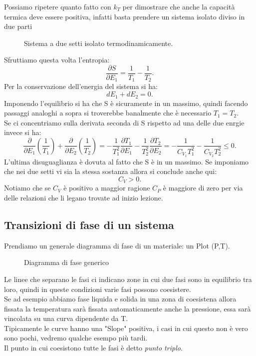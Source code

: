 \noindent 
Possiamo ripetere quanto fatto con $k_{T}$ per dimostrare che anche la capacità termica deve essere positiva, infatti basta prendere un sistema isolato diviso in due parti
\begin{figure}[H]
    \centering
    \caption{Sistema a due setti isolato termodinamicamente.}
    \label{fig:sistema-isolato}
\end{figure}
\noindent
Sfruttiamo questa volta l'entropia:
\[
	\frac{\partial S}{\partial E_1} = \frac{1}{T_1}- \frac{1}{T_2}
.\] 
Per la conservazione dell'energia del sistema si ha:
\[
	dE_1 + dE_2=0
.\] 
Imponendo l'equilibrio si ha che S è sicuramente in un massimo, quindi facendo passaggi analoghi a sopra si troverebbe banalmente che è necessario $T_1 = T_2$.\\
Se ci concentriamo sulla derivata seconda di S rispetto ad una delle due enrgie invece si ha:
\[
	\frac{\partial }{\partial E_1} \left( \frac{1}{T_1} \right) + \frac{\partial }{\partial E_2} \left( \frac{1}{T_2} \right) =
	-\frac{1}{T_1^2}\frac{\partial T_1}{\partial E_1} -\frac{1}{T_2^2}\frac{\partial T_2}{\partial E_2} = 
	-\frac{1}{C_{V_1}T_1^2}-\frac{1}{C_{V_2}T_2^2} \le 0
.\] 
L'ultima disuguaglianza è dovuta al fatto che S è in un massimo. Se imponiamo che nei due setti vi sia la stessa sostanza allora si conclude anche qui:
\[
	C_{V}>0
.\] 
Notiamo che se $C_{V}$ è positivo a maggior ragione $C_{P}$ è maggiore di zero per via delle relazioni che li legano trovate ad inizio lezione.

\subsection{Transizioni di fase di un sistema}%
\label{sec:transizioni-di-fase}
Prendiamo un generale diagramma di fase di un materiale: un Plot (P,T).
\begin{figure}[H]
    \centering
    \caption{Diagramma di fase generico}
    \label{fig:diagramma-di-fase-generico}
\end{figure}
\noindent
Le linee che separano le fasi ci indicano zone in cui due fasi sono in equilibrio tra loro, quindi in queste condizioni varie fasi possono coesistere. \\
Se ad esempio abbiamo fase liquida e solida in una zona di coesistena allora fissata la temperatura sarà fissata automaticamente anche la pressione, essa sarà vincolata su una curva dipendente da T.\\
Tipicamente le curve hanno una "Slope" positiva, i casi in cui questo non è vero sono pochi, vedremo qualche esempo più tardi.\\
Il punto in cui coesistono tutte le fasi è detto \textit{punto triplo}.

